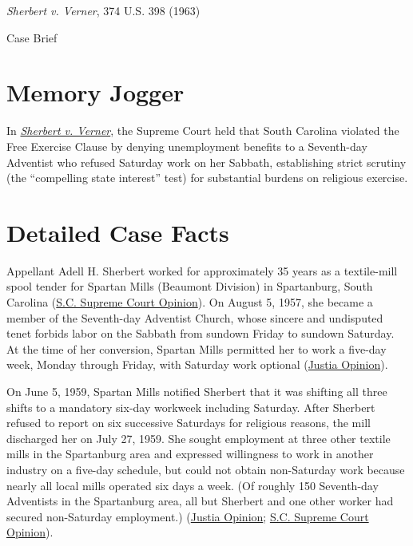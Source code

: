 \documentclass[12pt]{article}
\begin{document}
\begin{center}
{\LARGE \textit{Sherbert v. Verner}, 374 U.S. 398 (1963)\par}
\vspace{0.8em}
{\large Case Brief\par}
\end{center}
\vspace{1em}

\section{Memory Jogger}

In \href{https://www.courtlistener.com/opinion/106660/sherbert-v-verner/}{\textit{Sherbert v. Verner}}, the Supreme Court held that South Carolina violated the Free Exercise Clause by denying unemployment benefits to a Seventh-day Adventist who refused Saturday work on her Sabbath, establishing strict scrutiny (the ``compelling state interest'' test) for substantial burdens on religious exercise.

\section{Detailed Case Facts}

Appellant Adell H. Sherbert worked for approximately 35 years as a textile-mill spool tender for Spartan Mills (Beaumont Division) in Spartanburg, South Carolina (\href{https://law.justia.com/cases/south-carolina/supreme-court/1962/17915-1.html}{S.C. Supreme Court Opinion}). On August 5, 1957, she became a member of the Seventh-day Adventist Church, whose sincere and undisputed tenet forbids labor on the Sabbath from sundown Friday to sundown Saturday. At the time of her conversion, Spartan Mills permitted her to work a five-day week, Monday through Friday, with Saturday work optional (\href{https://supreme.justia.com/cases/federal/us/374/398/}{Justia Opinion}).

On June 5, 1959, Spartan Mills notified Sherbert that it was shifting all three shifts to a mandatory six-day workweek including Saturday. After Sherbert refused to report on six successive Saturdays for religious reasons, the mill discharged her on July 27, 1959. She sought employment at three other textile mills in the Spartanburg area and expressed willingness to work in another industry on a five-day schedule, but could not obtain non-Saturday work because nearly all local mills operated six days a week. (Of roughly 150 Seventh-day Adventists in the Spartanburg area, all but Sherbert and one other worker had secured non-Saturday employment.) (\href{https://supreme.justia.com/cases/federal/us/374/398/}{Justia Opinion}; \href{https://law.justia.com/cases/south-carolina/supreme-court/1962/17915-1.html}{S.C. Supreme Court Opinion}).
\end{document}

